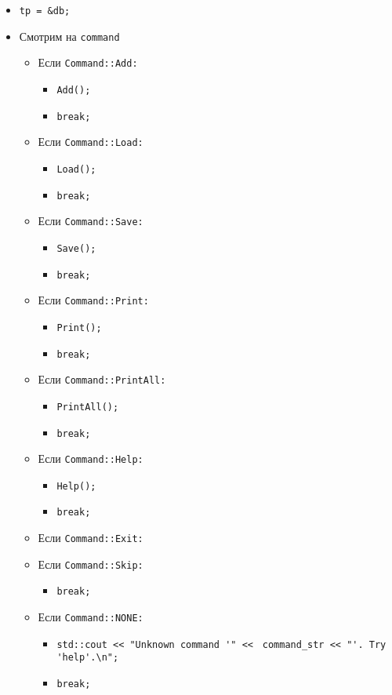 \begin{itemize}
	\item \verb|tp = &db;|
	\item Смотрим на \verb|command|
		\begin{itemize}
			\item Если \verb|Command::Add:|
				\begin{itemize}
					\item \verb|Add();|
					\item \verb|break;|
				\end{itemize}
			\item Если \verb|Command::Load:|
				\begin{itemize}
					\item \verb|Load();|
					\item \verb|break;|
				\end{itemize}
			\item Если \verb|Command::Save:|
				\begin{itemize}
					\item \verb|Save();|
					\item \verb|break;|
				\end{itemize}
			\item Если \verb|Command::Print:|
				\begin{itemize}
					\item \verb|Print();|
					\item \verb|break;|
				\end{itemize}
			\item Если \verb|Command::PrintAll:|
				\begin{itemize}
					\item \verb|PrintAll();|
					\item \verb|break;|
				\end{itemize}
			\item Если \verb|Command::Help:|
				\begin{itemize}
					\item \verb|Help();|
					\item \verb|break;|
				\end{itemize}
			\item Если \verb|Command::Exit:|
			\item Если \verb|Command::Skip:|
				\begin{itemize}
					\item \verb|break;|
				\end{itemize}
			\item Если \verb|Command::NONE:|
				\begin{itemize}
					\item \verb|std::cout << "Unknown command '" << |
					\verb|command_str << "'. Try 'help'.\n";|
					\item \verb|break;|
				\end{itemize}
		\end{itemize}
\end{itemize}


